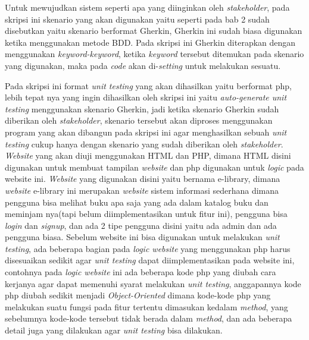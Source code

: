 \documentclass[a4paper,twoside]{article}
\begin{document}
\begin{enumerate}
		Untuk mewujudkan sistem seperti apa yang diinginkan oleh \textit{stakeholder}, pada skripsi ini skenario yang akan digunakan yaitu seperti pada bab 2 sudah disebutkan yaitu skenario berformat Gherkin, Gherkin ini sudah biasa digunakan ketika menggunakan metode BDD. Pada skripsi ini Gherkin diterapkan dengan menggunakan \textit{keyword-keyword}, ketika \textit{keyword} tersebut ditemukan pada skenario yang digunakan, maka pada \textit{code} akan di-\textit{setting} untuk melakukan sesuatu. 
		
		Pada skripsi ini format \textit{unit testing} yang akan dihasilkan yaitu berformat php, lebih tepat nya yang ingin dihasilkan oleh skripsi ini yaitu \textit{auto-generate unit testing} menggunakan skenario Gherkin, jadi ketika skenario Gherkin sudah diberikan oleh \textit{stakeholder}, skenario tersebut akan diproses menggunakan program yang akan dibangun pada skripsi ini agar menghasilkan sebuah \textit{unit testing} cukup hanya dengan skenario yang sudah diberikan oleh \textit{stakeholder}. \textit{Website} yang akan diuji menggunakan HTML dan PHP, dimana HTML disini digunakan untuk membuat tampilan \textit{website} dan php digunakan untuk \textit{logic} pada website ini. \textit{Website} yang digunakan disini yaitu bernama e-library, dimana \textit{website} e-library ini merupakan \textit{website} sistem informasi sederhana dimana pengguna bisa melihat buku apa saja yang ada dalam katalog buku dan meminjam nya(tapi belum diimplementasikan untuk fitur ini), pengguna bisa \textit{login} dan \textit{signup}, dan ada 2 tipe pengguna disini yaitu ada admin dan ada pengguna biasa. Sebelum website ini bisa digunakan untuk melakukan \textit{unit testing}, ada beberapa bagian pada \textit{logic website} yang menggunakan php harus disesuaikan sedikit agar \textit{unit testing} dapat diimplementasikan pada website ini, contohnya pada \textit{logic website} ini ada beberapa kode php yang diubah cara kerjanya agar dapat memenuhi syarat melakukan \textit{unit testing}, anggapannya kode php diubah sedikit menjadi \textit{Object-Oriented} dimana kode-kode php yang melakukan suatu fungsi pada fitur tertentu dimasukan kedalam \textit{method}, yang sebelumnya kode-kode tersebut tidak berada dalam \textit{method}, dan ada beberapa detail juga yang dilakukan agar \textit{unit testing} bisa dilakukan.
		

\end{enumerate}
\end{document}
